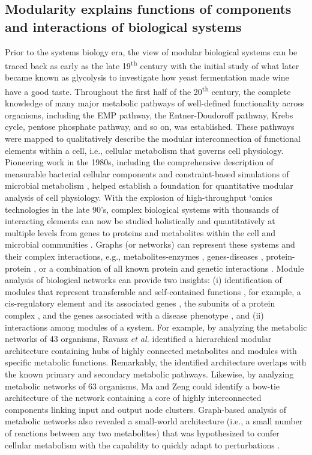\subsection{Modularity explains functions of components and interactions of biological systems}

Prior to the systems biology era, the view of modular biological systems can be traced back as early as the late 19\textsuperscript{th} century with the initial study of what later became known as glycolysis to investigate how yeast fermentation made wine have a good taste.
Throughout the first half of the 20\textsuperscript{th} century, the complete knowledge of many major metabolic pathways of well-defined functionality across organisms, including the EMP pathway, the Entner-Doudoroff pathway, Krebs cycle, pentose phosphate pathway, and so on, was established.
These pathways were mapped to qualitatively describe the modular interconnection of functional elements within a cell, i.e., cellular metabolism that governs cell physiology.
Pioneering work in the 1980s, including the comprehensive description of measurable bacterial cellular components \citep{neidhardt1990} and constraint-based simulations of microbial metabolism \citep{fell1986}, helped establish a foundation for quantitative modular analysis of cell physiology.
With the explosion of high-throughput `omics technologies in the late 90's, complex biological systems with thousands of interacting elements can now be studied holistically and quantitatively at multiple levels from genes to proteins and metabolites within the cell and microbial communities \citep{rodriguez2014, lowe2017, patti2012, wilkins1996}.
Graphs (or networks) can represent these systems \citep{alon2003} and their complex interactions, e.g., metabolites-enzymes \citep{ma2003, ravasz2002}, genes-diseases \citep{goh2007}, protein-protein \citep{szklarczyk2017}, or a combination of all known protein and genetic interactions \citep{chatr-aryamontri2017}.
Module analysis of biological networks can provide two insights: (i) identification of modules that represent transferable and self-contained functions \citep{mitra2013}, for example, a cis-regulatory element and its associated genes \citep{ohta2008}, the subunits of a protein complex \citep{guruharsha2011, havugimana2012}, and the genes associated with a disease phenotype \citep{goh2007}, and (ii) interactions among modules of a system.
For example, by analyzing the metabolic networks of 43 organisms, Ravasz \emph{et al.} \citep{ravasz2002} identified a hierarchical modular architecture containing hubs of highly connected metabolites and modules with specific metabolic functions.
Remarkably, the identified architecture overlaps with the known primary and secondary metabolic pathways.
Likewise, by analyzing metabolic networks of 63 organisms, Ma and Zeng \citep{ma2003} could identify a bow-tie architecture of the network containing a core of highly interconnected components linking input and output node clusters.
Graph-based analysis of metabolic networks also revealed a small-world architecture (i.e., a small number of reactions between any two metabolites) that was hypothesized to confer cellular metabolism with the capability to quickly adapt to perturbations \citep{wagner2001}.

